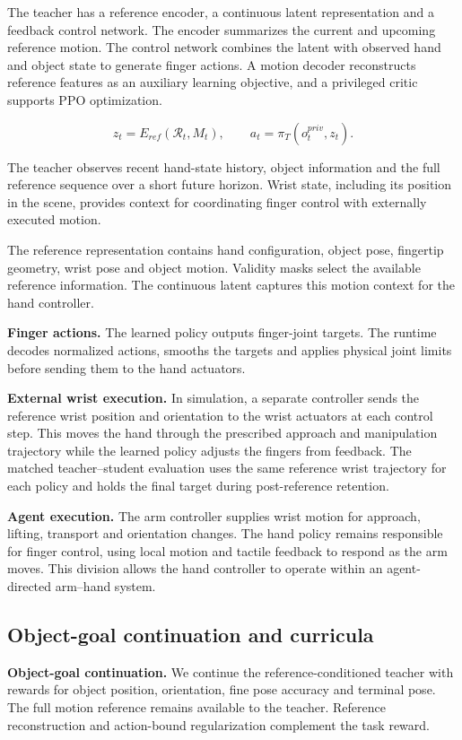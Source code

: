 \documentclass[10pt,twocolumn]{article}
\begin{document}
The teacher has a reference encoder, a continuous latent representation and a feedback control network. The encoder summarizes the current and upcoming reference motion. The control network combines the latent with observed hand and object state to generate finger actions. A motion decoder reconstructs reference features as an auxiliary learning objective, and a privileged critic supports PPO optimization.

\[
z_t=E_{ref}(\mathcal R_t,M_t),\qquad a_t=\pi_T(o_t^{priv},z_t).
\]

The teacher observes recent hand-state history, object information and the full reference sequence over a short future horizon. Wrist state, including its position in the scene, provides context for coordinating finger control with externally executed motion.

The reference representation contains hand configuration, object pose, fingertip geometry, wrist pose and object motion. Validity masks select the available reference information. The continuous latent captures this motion context for the hand controller.

\textbf{Finger actions.} The learned policy outputs finger-joint targets. The runtime decodes normalized actions, smooths the targets and applies physical joint limits before sending them to the hand actuators.

\textbf{External wrist execution.} In simulation, a separate controller sends the reference wrist position and orientation to the wrist actuators at each control step. This moves the hand through the prescribed approach and manipulation trajectory while the learned policy adjusts the fingers from feedback. The matched teacher--student evaluation uses the same reference wrist trajectory for each policy and holds the final target during post-reference retention.

\textbf{Agent execution.} The arm controller supplies wrist motion for approach, lifting, transport and orientation changes. The hand policy remains responsible for finger control, using local motion and tactile feedback to respond as the arm moves. This division allows the hand controller to operate within an agent-directed arm--hand system.

\subsection{Object-goal continuation and curricula}

\textbf{Object-goal continuation.} We continue the reference-conditioned teacher with rewards for object position, orientation, fine pose accuracy and terminal pose. The full motion reference remains available to the teacher. Reference reconstruction and action-bound regularization complement the task reward.
\end{document}
